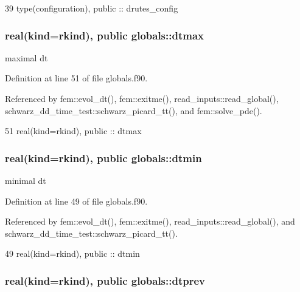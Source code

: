 \begin{DoxyCode}
39   \textcolor{keywordtype}{type}(configuration), \textcolor{keywordtype}{public} :: drutes_config
\end{DoxyCode}
\subsubsection[{dtmax}]{\setlength{\rightskip}{0pt plus 5cm}real(kind=rkind), public globals\+::dtmax}\label{namespaceglobals_a5db64d024c9cba2b5b9b2fe31ee25565}


maximal dt 



Definition at line 51 of file globals.\+f90.



Referenced by fem\+::evol\+\_\+dt(), fem\+::exitme(), read\+\_\+inputs\+::read\+\_\+global(), schwarz\+\_\+dd\+\_\+time\+\_\+test\+::schwarz\+\_\+picard\+\_\+tt(), and fem\+::solve\+\_\+pde().


\begin{DoxyCode}
51   \textcolor{keywordtype}{real(kind=rkind)}, \textcolor{keywordtype}{public} :: dtmax
\end{DoxyCode}
\subsubsection[{dtmin}]{\setlength{\rightskip}{0pt plus 5cm}real(kind=rkind), public globals\+::dtmin}\label{namespaceglobals_a5875ff05da92d701a300a494d6de9aee}


minimal dt 



Definition at line 49 of file globals.\+f90.



Referenced by fem\+::evol\+\_\+dt(), fem\+::exitme(), read\+\_\+inputs\+::read\+\_\+global(), and schwarz\+\_\+dd\+\_\+time\+\_\+test\+::schwarz\+\_\+picard\+\_\+tt().


\begin{DoxyCode}
49   \textcolor{keywordtype}{real(kind=rkind)}, \textcolor{keywordtype}{public} :: dtmin
\end{DoxyCode}
\subsubsection[{dtprev}]{\setlength{\rightskip}{0pt plus 5cm}real(kind=rkind), public globals\+::dtprev}\label{namespaceglobals_afd3b963da85bd63772a7064c3cb0447a}


